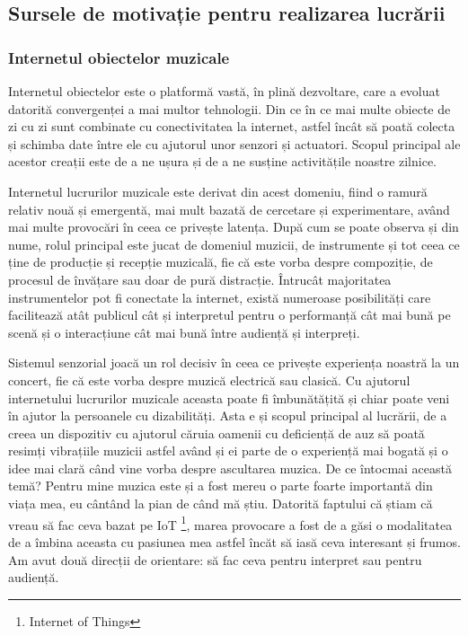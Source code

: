 \documentclass[../IoMusT.tex]{subfiles}
\begin{document}
\subsection{Sursele de motivație pentru realizarea lucrării}
\subsubsection{Internetul obiectelor muzicale}
Internetul obiectelor este o platformă vastă,  în plină dezvoltare, care a evoluat datorită convergenței a mai multor tehnologii. Din ce în ce mai multe obiecte de zi cu zi sunt combinate cu conectivitatea la internet, astfel încât să poată colecta și schimba date între ele cu ajutorul unor senzori și actuatori. Scopul principal ale acestor creații este de a ne ușura și de a ne susține activitățile noastre zilnice.
\\
\par Internetul lucrurilor muzicale este derivat din acest domeniu, fiind o ramură relativ nouă și emergentă, mai mult bazată de cercetare și experimentare, având mai multe provocări în ceea ce privește latența. După cum se poate observa și din nume, rolul principal este jucat de domeniul muzicii, de instrumente și tot ceea ce ține de producție și recepție muzicală, fie că este vorba despre compoziție, de procesul de învățare sau doar de pură dis\-trac\-ți\-e. Întrucât majoritatea instrumentelor pot fi conectate la internet, există numeroase posibilități care facilitează atât publicul cât și interpretul pentru o performanță cât mai bună pe scenă și o interacțiune cât mai bună între audiență și interpreți.\cite{IoMusT}
\\
\par Sistemul senzorial joacă un rol decisiv în ceea ce privește experiența noastră la un concert, fie că este vorba despre muzică electrică sau clasică. Cu ajutorul internetului lucrurilor muzicale aceasta poate fi îmbunătățită și chiar poate veni în ajutor la persoanele cu dizabilități. Asta e și scopul principal al lucrării, de a creea un dispozitiv cu ajutorul căruia oamenii cu deficiență de auz să poată resimți vibrațiile muzicii astfel având și ei parte de o experiență mai bogată și o idee mai clară când vine vorba despre ascultarea muzica. De ce întocmai această temă? Pentru mine mu\-zi\-ca este și a fost mereu o parte foarte importantă din viața mea, eu cântând la pian de când mă știu. Datorită faptului că știam că vreau să fac ceva bazat pe IoT \footnote{Internet of Things}, marea provocare a fost de a găsi o modalitatea de a îmbina aceasta cu pasiunea mea astfel încăt să iasă ceva interesant și frumos. Am avut două direcții de orientare: să fac ceva pentru interpret sau pentru audiență.
\end{document}
